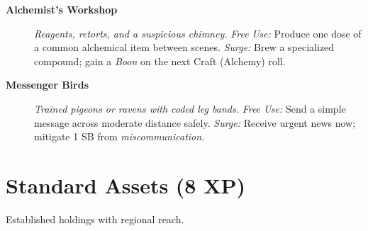 \begin{description}
  \item[\textbf{Alchemist's Workshop}]  \emph{Reagents, retorts, and a suspicious chimney.} \emph{Free Use:} Produce one dose of a common alchemical item between scenes. \emph{Surge:} Brew a specialized compound; gain a \emph{Boon} on the next Craft (Alchemy) roll.

  \item[\textbf{Messenger Birds}]  \emph{Trained pigeons or ravens with coded leg bands.} \emph{Free Use:} Send a simple message across moderate distance safely. \emph{Surge:} Receive urgent news now; mitigate 1 SB from \emph{miscommunication}.
\end{description}

\section{Standard Assets (8 XP)}
Established holdings with regional reach.
